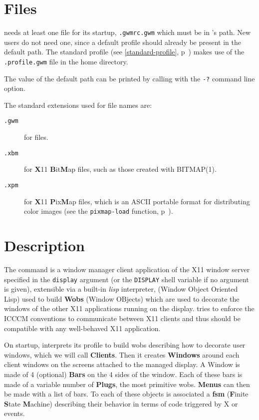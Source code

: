 \section{Files}

{\GWM} needs at least one file for its startup, \verb".gwmrc.gwm" which must
be in {\GWM}'s path. New users do not need one, since a default profile should
already be present in the default path. The standard profile (see
\ref{standard-profile}, p~\pageref{standard-profile}) makes use of the
\verb".profile.gwm" file in the home directory.

The value of the default path can be printed by calling {\GWM} with the
\verb"-?" command line option.

The standard extensions used for {\GWM} file names are:
\begin{description}
\item[{\tt .gwm}] for {\WOOL} files.
\item[{\tt .xbm}] for {\bf X}11 {\bf B}it{\bf M}ap files, such as those
created with BITMAP(1).
\item[{\tt .xpm}] for {\bf X}11 {\bf P}ix{\bf M}ap files, which is an ASCII
portable format for distributing color images (see the \verb"pixmap-load"
function, p~\pageref{pixmap-load}).
\end{description}

\section{Description}

The {\GWM} command is a window manager client application of the X11 window
server specified in the {\tt display} argument (or the  {\tt DISPLAY} shell
variable if no argument is given), extensible via a built-in {\it lisp\/}
interpreter, {\WOOL} (Window Object Oriented Lisp) used to build {\bf Wobs}
(Window OBjects) which are used to decorate the windows of the other X11
applications running on the display. {\GWM}
tries to enforce the ICCCM conventions to communicate between X11 clients
and thus should be compatible with any well-behaved X11 application.

On startup, {\GWM} interprets its profile to build wobs describing how to
decorate user windows, which we will call {\bf Clients}.  Then it creates
{\bf Windows} around each client windows on the screens attached to the
managed display. A Window is made of 4 (optional) {\bf Bars} on the 4 sides
of the window.  Each of these bars is made of a variable number of {\bf
Plugs}, the most primitive wobs.  {\bf Menus} can then be made with a list
of bars. To each of these objects is associated a {\bf fsm} ({\bf F}inite
{\bf S}tate {\bf M}achine) describing their behavior in terms of {\WOOL}
code triggered by X or {\WOOL} events.

